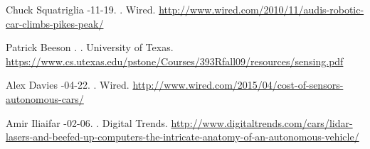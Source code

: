 \begin{thebibliography}{}
Chuck Squatriglia
-11-19.
.
\newblock Wired.
\newblock
\href{http://www.wired.com/2010/11/audis-robotic-car-climbs-pikes-peak/}{http://www.wired.com/2010/11/audis-robotic-car-climbs-pikes-peak/}

Patrick Beeson
.
.
\newblock University of Texas.
\newblock
\href{https://www.cs.utexas.edu/~pstone/Courses/393Rfall09/resources/sensing.pdf}{https://www.cs.utexas.edu/{\texttildelow}pstone/Courses/393Rfall09/resources/sensing.pdf}

Alex Davies
-04-22.
.
\newblock Wired.
\newblock
\href{http://www.wired.com/2015/04/cost-of-sensors-autonomous-cars/}{http://www.wired.com/2015/04/cost-of-sensors-autonomous-cars/}

Amir Iliaifar
-02-06.
.
\newblock Digital Trends.
\newblock
\href{http://www.digitaltrends.com/cars/lidar-lasers-and-beefed-up-computers-the-intricate-anatomy-of-an-autonomous-vehicle/}{http://www.digitaltrends.com/cars/lidar-lasers-and-beefed-up-computers-the-intricate-anatomy-of-an-autonomous-vehicle/}

\end{thebibliography}

